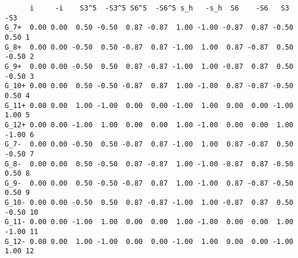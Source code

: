 \documentclass[12pt,a4paper,twoside]{report}
\begin{document}
\begin{tcolorbox}
\begin{scriptsize}
\begin{verbatim}
      i     -i    S3^5  -S3^5 S6^5  -S6^5 s_h   -s_h  S6    -S6   S3    -S3
G_7+  0.00 0.00  0.50 -0.50  0.87 -0.87  1.00 -1.00 -0.87  0.87 -0.50  0.50 1
G_8+  0.00 0.00 -0.50  0.50 -0.87  0.87 -1.00  1.00  0.87 -0.87  0.50 -0.50 2
G_9+  0.00 0.00 -0.50  0.50  0.87 -0.87 -1.00  1.00 -0.87  0.87  0.50 -0.50 3
G_10+ 0.00 0.00  0.50 -0.50 -0.87  0.87  1.00 -1.00  0.87 -0.87 -0.50  0.50 4
G_11+ 0.00 0.00  1.00 -1.00  0.00  0.00 -1.00  1.00  0.00  0.00 -1.00  1.00 5
G_12+ 0.00 0.00 -1.00  1.00  0.00  0.00  1.00 -1.00  0.00  0.00  1.00 -1.00 6
G_7-  0.00 0.00 -0.50  0.50 -0.87  0.87 -1.00  1.00  0.87 -0.87  0.50 -0.50 7
G_8-  0.00 0.00  0.50 -0.50  0.87 -0.87  1.00 -1.00 -0.87  0.87 -0.50  0.50 8
G_9-  0.00 0.00  0.50 -0.50 -0.87  0.87  1.00 -1.00  0.87 -0.87 -0.50  0.50 9
G_10- 0.00 0.00 -0.50  0.50  0.87 -0.87 -1.00  1.00 -0.87  0.87  0.50 -0.50 10
G_11- 0.00 0.00 -1.00  1.00  0.00  0.00  1.00 -1.00  0.00  0.00  1.00 -1.00 11
G_12- 0.00 0.00  1.00 -1.00  0.00  0.00 -1.00  1.00  0.00  0.00 -1.00  1.00 12
\end{verbatim} 
\end{scriptsize}
\end{tcolorbox}
\end{document}
